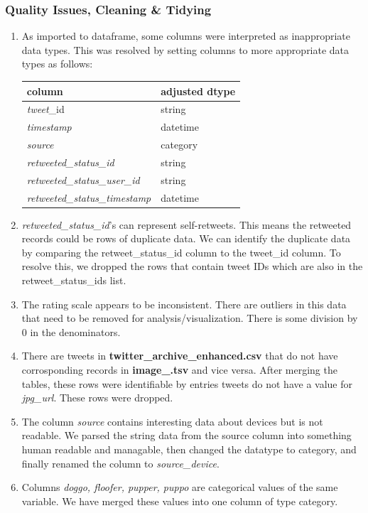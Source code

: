 \documentclass{report}
\begin{document}
		\subsubsection{Quality Issues, Cleaning \& Tidying}
			\begin{enumerate}
				\item As imported to dataframe, some columns were interpreted as inappropriate data types. This was resolved by setting 
				columns to more appropriate data types as follows:\\
					\begin{tabular}{ll}
						\toprule
						\textbf{column} & \textbf{adjusted dtype} \\
						\midrule
						\textit{tweet}\_id & string \\
						\textit{timestamp} & datetime \\
						\textit{source} & category \\
						\textit{retweeted\_status\_id} & string \\ 
						\textit{retweeted\_status\_user\_id} & string \\ 
						\textit{retweeted\_status\_timestamp} & datetime \\    
					\end{tabular}
				\item \textit{retweeted\_status\_id}'s can represent self-retweets. This means the retweeted records could be
					rows of duplicate data. We can identify the duplicate data by comparing the retweet\_status\_id column to the tweet\_id column. 
					To resolve this, we dropped the rows that contain tweet IDs which are also in the retweet\_status\_ids list.
				\item The rating scale appears to be inconsistent. There are outliers in this data that need 
					to be removed for analysis/visualization. There is some division by 0 in the denominators.
				\item There are tweets in \textbf{twitter\_archive\_enhanced.csv} that do not have corrosponding records in \textbf{image\_.tsv} and vice versa.
					After merging the tables, these rows were identifiable by entries tweets do not have a value for \textit{jpg\_url}. These rows were dropped.
				\item The column \textit{source} contains interesting data about devices but is not readable. We parsed the string data from the source column into
					something human readable and managable, then changed the datatype to category, and finally renamed the column to \textit{source\_device}.
				\item Columns \textit{doggo, floofer, pupper, puppo} are categorical values of the same variable. We have merged these values into one column of type category. 
			\end{enumerate} 
\end{document}
